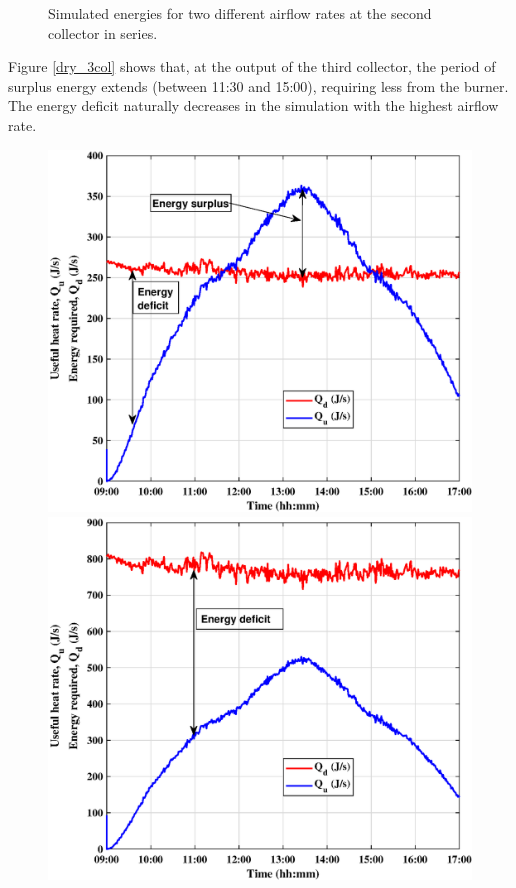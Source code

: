 \begin{figure}[ht!]
\begin{minipage}{0.50\columnwidth}
	\end{minipage}
	\caption{Simulated energies for two different airflow rates at the second collector in series.}
	\label{dry_2col}
\end{figure}

Figure \ref{dry_3col} shows that, at the output of the third collector, the period of surplus energy extends (between 11:30 and 15:00), requiring less from the burner. The energy deficit naturally decreases in the simulation with the highest airflow rate.

\begin{figure}[ht!]
	\begin{minipage}{0.50\columnwidth}
		\includegraphics[scale=0.45]{figs/dry_low_3col.eps}
		
	\end{minipage}
	\begin{minipage}{0.50\columnwidth}
		\includegraphics[scale=0.45]{figs/dry_high_3col.eps}
		

\end{minipage}
\end{figure}
